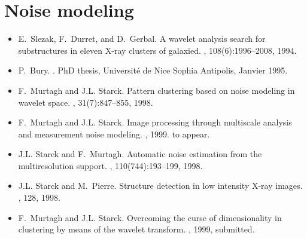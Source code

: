 \section{Noise modeling}
\begin{itemize}
 
\item E.~Slezak, F.~Durret, and D.~Gerbal.
\newblock A wavelet analysis search for substructures in eleven X-ray clusters
  of galaxied.
, 108(6):1996--2008, 1994.

\item P.~Bury.
.
\newblock PhD thesis, Universit\'e de Nice Sophia Antipolis, Janvier 1995.

\item F.~Murtagh and J.L. Starck.
\newblock Pattern clustering based on noise modeling in wavelet space.
, 31(7):847--855, 1998.

\item F.~Murtagh and J.L. Starck.
\newblock Image processing through multiscale analysis and measurement noise
  modeling.
, 1999.
\newblock to appear.

\item J.L. Starck and F.~Murtagh.
\newblock Automatic noise estimation from the multiresolution support.
,
  110(744):193--199, 1998.
 
\item J.L. Starck and M.~Pierre.
\newblock Structure detection in low intensity X-ray images.
, 128, 1998.

\item F.~Murtagh and J.L. Starck.
\newblock Overcoming the curse of dimensionality in clustering by means of the
  wavelet transform.
, 1999,
\newblock submitted.

\end{itemize}


